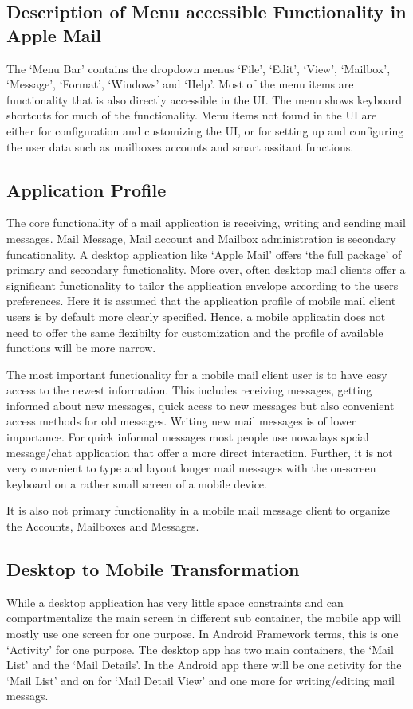 \documentclass[a4paper,11pt,twoside]{article}
\begin{document}
\subsection{Description of Menu accessible Functionality in Apple Mail}
The `Menu Bar' contains the dropdown menus `File', `Edit', `View', `Mailbox',
`Message', `Format', `Windows' and `Help'. Most of the menu items are functionality
that is also directly accessible in the UI. The menu shows keyboard shortcuts for
much of the functionality. Menu items not found in the UI are either for
configuration and customizing the UI, or for setting up and configuring the user
data such as mailboxes accounts and smart assitant functions.


\subsection{Application Profile}
The core functionality of a mail application is receiving, writing and sending
mail messages. Mail Message, Mail account and Mailbox administration is secondary
funcationality. A desktop application like `Apple Mail' offers `the full package'
of primary and secondary functionality. More over, often desktop mail clients
offer a significant functionality to tailor the application envelope according to
the users preferences. Here it is assumed that the application profile of mobile
mail client users is by default more clearly specified. Hence, a mobile applicatin
does not need to offer the same flexibilty for customization and the profile of
available functions will be more narrow.

The most important functionality for a mobile mail client user is to have easy
access to the newest information. This includes receiving messages, getting informed
about new messages, quick acess to new messages but also convenient access methods
for old messages. Writing new mail messages is of lower importance. For quick
informal messages most people use nowadays spcial message/chat application that
offer a more direct interaction. Further, it is not very convenient to type and
layout longer mail messages with the on-screen keyboard on a rather small screen
of a mobile device.

It is also not primary functionality in a mobile mail message client to organize
the Accounts, Mailboxes and Messages.

\subsection{Desktop to Mobile Transformation}
While a desktop application has very little space constraints and can
compartmentalize the main screen in different sub container, the mobile app will
mostly use one screen for one purpose. In Android Framework terms, this is
one `Activity' for one purpose. The desktop app has two main containers, the
`Mail List' and the `Mail Details'. In the Android app there will be one
activity for the `Mail List' and on for `Mail Detail View' and one
more for writing/editing mail messags.
\end{document}
